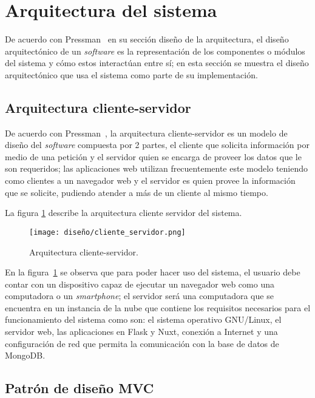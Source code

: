 \section{Arquitectura del sistema}

De acuerdo con Pressman~\cite{pressman_software_2005} en su sección diseño de la arquitectura, el diseño arquitectónico de un \textit{software} es la representación de los componentes o módulos del sistema y cómo estos interactúan entre sí; en esta sección se muestra el diseño arquitectónico que usa el sistema como parte de su implementación.

\subsection{Arquitectura cliente-servidor}

De acuerdo con Pressman~\cite{pressman_software_2005}, la arquitectura cliente-servidor es un modelo de diseño del \textit{software} compuesta por 2 partes, el cliente que solicita información por medio de una petición y el servidor quien se encarga de proveer los datos que le son requeridos; las aplicaciones web utilizan frecuentemente este modelo teniendo como clientes a un navegador web y el servidor es quien provee la información que se solicite, pudiendo atender a más de un cliente al mismo tiempo.

La figura \ref{img:arq_client_server} describe la arquitectura cliente servidor del sistema.

\begin{figure}[H]
    \centering
    \texttt{[image: diseño/cliente\_servidor.png]}
    \caption{Arquitectura cliente-servidor.}
    \label{img:arq_client_server}
\end{figure}


En la figura~\ref{img:arq_client_server} se observa que para poder hacer uso del sistema, el usuario debe contar con un dispositivo capaz de ejecutar un navegador web como una computadora o un \textit{smartphone}; el servidor será una computadora que se encuentra en un instancia de la nube que contiene los requisitos necesarios para el funcionamiento del sistema como son: el sistema operativo GNU/Linux, el servidor web, las aplicaciones en Flask y Nuxt, conexión a Internet y una configuración de red que permita la comunicación con la base de datos de MongoDB.


\subsection{Patrón de diseño MVC}

